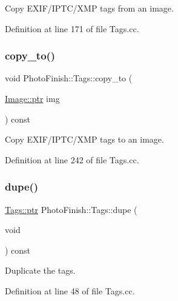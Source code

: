 Copy E\+X\+I\+F/\+I\+P\+T\+C/\+X\+MP tags from an image. 



Definition at line 171 of file Tags.\+cc.

\mbox{\label{class_photo_finish_1_1_tags_afd3ddbd68aae48ff6ae9d71896e4ccc4}} 
\subsubsection{\texorpdfstring{copy\+\_\+to()}{copy\_to()}}
{\footnotesize\ttfamily void Photo\+Finish\+::\+Tags\+::copy\+\_\+to (\begin{DoxyParamCaption}\item[{\hyperlink{class_photo_finish_1_1_image_ab336203305ed3a1397d7245063353b5a}{Image\+::ptr}}]{img }\end{DoxyParamCaption}) const}



Copy E\+X\+I\+F/\+I\+P\+T\+C/\+X\+MP tags to an image. 



Definition at line 242 of file Tags.\+cc.

\mbox{\label{class_photo_finish_1_1_tags_a6e3beb9b058d670e1fda67ebc4181d05}} 
\subsubsection{\texorpdfstring{dupe()}{dupe()}}
{\footnotesize\ttfamily \hyperlink{class_photo_finish_1_1_tags_a3f9b01990d51bb4f4e5086182a8ddcf9}{Tags\+::ptr} Photo\+Finish\+::\+Tags\+::dupe (\begin{DoxyParamCaption}\item[{void}]{ }\end{DoxyParamCaption}) const}



Duplicate the tags. 



Definition at line 48 of file Tags.\+cc.

\mbox{\label{class_photo_finish_1_1_tags_a27c18af86d774db3c8f741e2f6db380b}} 
